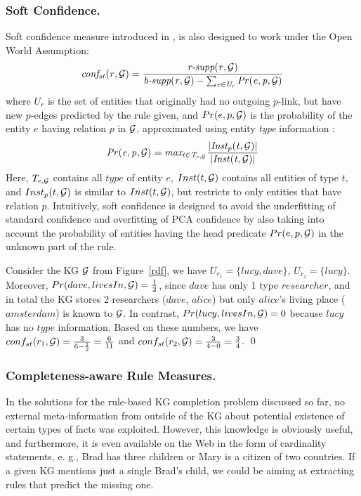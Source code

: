 \subsubsection{Soft Confidence.} Soft confidence measure introduced in \cite{rdf2rules}, is also designed to work under the Open World Assumption:
\[\mathit{conf_{st}(r, \mathcal{G}) = \frac{\textit{r-supp}(r, \mathcal{G})}{\textit{b-supp}(r,\mathcal{G}) - \sum_{e \in U_r}Pr(e,p,\mathcal{G})}} \]
where $U_r$ is the set of entities that %
originally had no outgoing %
$p$-link, but have new $p$-edges predicted by the rule given, and $Pr(e,p,\mathcal{G})$ is the probability of the entity $e$ having relation $p$ in $\mathcal{G}$, approximated using entity \textit{type} information \cite{rdf2rules}:
\[\mathit{Pr(e,p,\mathcal{G})  = max_{t \in T_{e,\mathcal{G}}}\frac{|Inst_p(t, \mathcal{G})|}{|Inst(t, \mathcal{G})|}{}}\]
Here, $T_{e,\mathcal{G}}$ contains all $type$ of entity $e$, $Inst(t, \mathcal{G})$ contains all entities of type $t$, and $Inst_p(t, \mathcal{G})$ is similar to $Inst(t, \mathcal{G})$, but restricts to only entities that have relation $p$.
Intuitively, soft confidence is designed to avoid the underfitting of standard confidence and overfitting of PCA confidence by also taking into account the probability of entities having the head predicate $Pr(e,p, \mathcal{G})$ in the unknown part of the rule.
\begin{example}
Consider the KG $\mathcal{G}$ from Figure~\ref{rdf}, we have $U_{r_1} = \{lucy, dave\}$, $U_{r_2} = \{lucy\}$. Moreover, $Pr(dave,livesIn,\mathcal{G}) = \frac{1}{2}$, since $dave$ has only 1 type $researcher$, and in total the KG stores 
2 researchers ($dave$, $alice$) but only $alice$'s living place ($amsterdam$) is known to $\mathcal{G}$. In contrast, $Pr(lucy,livesIn,\mathcal{G}) = 0$ because $lucy$ has no $type$ information.
Based on these numbers, we have $conf_{st}(r_1,\mathcal{G}) = \frac{3}{6-\frac{1}{2}} = \frac{6}{11}$ and $conf_{st}(r_2,\mathcal{G}) = \frac{3}{4-0} = \frac{3}{4}$.
\qed
\end{example}
\subsubsection{Completeness-aware Rule Measures.}  
In the solutions for the rule-based KG completion problem discussed so far, no external meta-information from outside of the KG about potential existence of certain types of facts was exploited. However, this knowledge is obviously useful, and furthermore, it is even available on the Web
in the form of cardinality statements, e. g., Brad has three children or Mary is a citizen of two countries. If a given KG mentions just a single Brad's child, we could be aiming at extracting rules that predict the missing
one.

